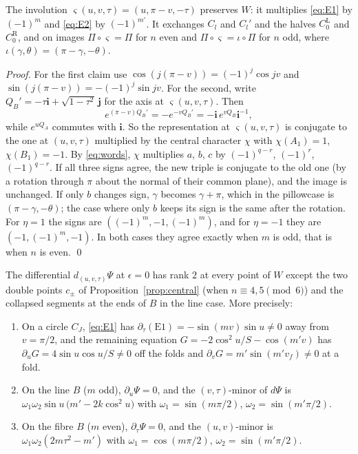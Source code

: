 \begin{lemma}[Symmetry]\label{lem:symmetry}
The involution $\varsigma(u,v,\tau)=(u,\pi-v,-\tau)$ preserves $W$: it multiplies \eqref{eq:E1} by $(-1)^m$ and
\eqref{eq:E2} by $(-1)^{m'}$. It exchanges $C_l$ and $C_l'$ and the halves $C_0^{\mathrm L}$ and $C_0^{\mathrm R}$, and on
images $\Pi\circ\varsigma=\Pi$ for $n$ even and $\Pi\circ\varsigma=\iota\circ\Pi$ for $n$ odd, where
$\iota(\gamma,\theta)=(\pi-\gamma,-\theta)$.
\end{lemma}

\begin{proof}
For the first claim use $\cos(j(\pi-v))=(-1)^j\cos jv$ and $\sin(j(\pi-v))=-(-1)^j\sin jv$. For the
second, write $Q_B'=-\tau\mathbf i+\sqrt{1-\tau^2}\,\mathbf j$ for the axis at $\varsigma(u,v,\tau)$. Then
\[
e^{(\pi-v)Q_B'}=-e^{-vQ_B'}=-\mathbf i\,e^{vQ_B}\mathbf i^{-1},
\]
while $e^{uQ_A}$ commutes with $\mathbf i$. So the
representation at $\varsigma(u,v,\tau)$ is conjugate to the one at $(u,v,\tau)$ multiplied by the central character
$\chi$ with $\chi(A_1)=1$, $\chi(B_1)=-1$. By \eqref{eq:words}, $\chi$ multiplies $a$, $b$, $c$ by $(-1)^{q-r}$,
$(-1)^r$, $(-1)^{q-r}$. If all three signs agree, the new triple is conjugate to the old one (by a rotation through
$\pi$ about the normal of their common plane), and the image is unchanged. If only $b$ changes sign, $\gamma$ becomes
$\gamma+\pi$, which in the pillowcase is $(\pi-\gamma,-\theta)$; the case where only $b$ keeps its sign is the same after
the rotation. For $\eta=1$ the signs are $((-1)^m,-1,(-1)^m)$, and for $\eta=-1$ they are $(-1,(-1)^m,-1)$. In both
cases they agree exactly when $m$ is odd, that is when $n$ is even. \qed
\end{proof}

\begin{lemma}\label{lem:rank}
The differential $d_{(u,v,\tau)}\Psi$ at $\epsilon=0$ has rank $2$ at every point of $W$ except the two double
points $c_\pm$ of Proposition~\ref{prop:central} (when $n\equiv4,5\pmod6$) and the collapsed segments at the ends of
$B$ in the line case. More precisely:
\begin{enumerate}
\item On a circle $C_J$, \eqref{eq:E1} has $\partial_\tau(\mathrm{E1})=-\sin(mv)\sin u\neq0$ away from $v=\pi/2$, and the
remaining equation $G=-2\cos^2u/S-\cos(m'v)$ has $\partial_uG=4\sin u\cos u/S\neq0$ off the folds and
$\partial_vG=m'\sin(m'v_f)\neq0$ at a fold.
\item On the line $B$ ($m$ odd), $\partial_u\Psi=0$, and the $(v,\tau)$-minor of $d\Psi$ is
$\omega_1\omega_2\sin u\,\bigl(m'-2k\cos^2u\bigr)$ with $\omega_1=\sin(m\pi/2)$, $\omega_2=\sin(m'\pi/2)$.
\item On the fibre $B$ ($m$ even), $\partial_\tau\Psi=0$, and the $(u,v)$-minor is $\omega_1\omega_2(2m\tau^2-m')$ with
$\omega_1=\cos(m\pi/2)$, $\omega_2=\sin(m'\pi/2)$.
\end{enumerate}
\end{lemma}

